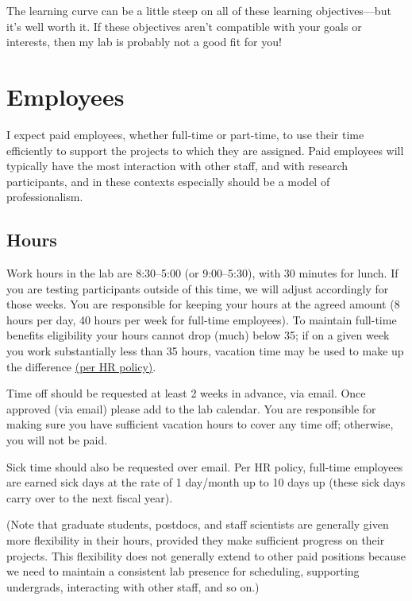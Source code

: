\documentclass[letterpaper,12pt,oneside]{memoir}
\begin{document}
The learning curve can be a little steep on all of these learning objectives---but it's well worth it. If these objectives aren't compatible with your goals or interests, then my lab is probably not a good fit for you!



\section{Employees}

I expect paid employees, whether full-time or part-time, to use their time efficiently to support the projects to which they are assigned. Paid employees will typically have the most interaction with other staff, and with research participants, and in these contexts especially should be a model of professionalism.

\subsection{Hours}
Work hours in the lab are 8:30--5:00 (or 9:00--5:30), with 30 minutes for lunch. If you are testing participants outside of this time, we will adjust accordingly for those weeks. You are responsible for keeping your hours at the agreed amount (8 hours per day, 40 hours per week for full-time employees). To maintain full-time benefits eligibility your hours cannot drop (much) below 35; if on a given week you work substantially less than 35 hours, vacation time may be used to make up the difference \href{http://www.temple.edu/hr/departments/employeerelations/documents/Employee_Manual_Feb_2016.pdf}{(per HR policy)}.

Time off should be requested at least 2 weeks in advance, via email. Once approved (via email) please add to the lab calendar. You are responsible for making sure you have sufficient vacation hours to cover any time off; otherwise, you will not be paid.

Sick time should also be requested over email. Per HR policy, full-time employees are earned sick days at the rate of 1 day/month up to 10 days up (these sick days carry over to the next fiscal year).

(Note that graduate students, postdocs, and staff scientists are generally given more flexibility in their hours, provided they make sufficient progress on their projects. This flexibility does not generally extend to other paid positions because we need to maintain a consistent lab presence for scheduling, supporting undergrads, interacting with other staff, and so on.)
\end{document}
